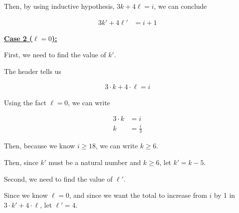 \documentclass[12pt]{article}
\begin{document}
\begin{itemize}
\begin{mdframed}
\begin{enumerate}[1.]
\begin{enumerate}[1.]
\begin{itemize}
\begin{mdframed}
                    \bigskip

                    Then, by using inductive hypothesis, $3k + 4\ell = i$, we can conclude

                    \begin{align}
                    3k' + 4\ell' &= i + 1
                    \end{align}

                    \end{mdframed}
                \end{itemize}

                \bigskip

                \begin{mdframed}
                \underline{\textbf{Case 2 ($\ell = 0$):}}

                \bigskip

                First, we need to find the value of $k'$.

                \bigskip

                The header tells us

                \begin{align}
                    3 \cdot k + 4 \cdot \ell = i
                \end{align}

                \bigskip

                Using the fact $\ell = 0$, we can write

                \begin{align}
                    3 \cdot k &= i\\
                    k &= \frac{i}{3}
                \end{align}

                \bigskip

                Then, because we know $i \geq 18$, we can write $k \geq 6$.

                \bigskip

                Then, since $k'$ must be a natural number and $k \geq 6$, let $k' = k - 5$.

                \bigskip

                Second, we need to find the value of $\ell'$.

                \bigskip

                Since we know $\ell = 0$, and since we want the total to increase from $i$ by 1
                in $3 \cdot k' + 4 \cdot \ell$, let $\ell' = 4$.


\end{mdframed}
\end{enumerate}
\end{enumerate}
\end{mdframed}
\end{itemize}
\end{document}
